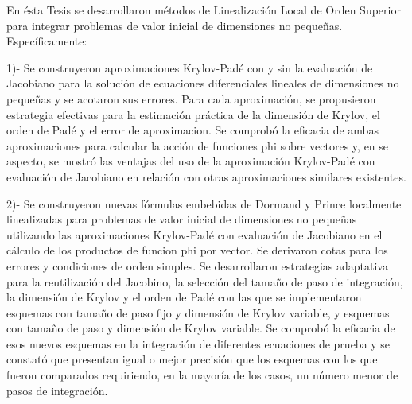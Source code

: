 \begin{conclusions}

    
    En ésta Tesis se desarrollaron métodos de Linealización Local de Orden Superior para integrar problemas de valor
    inicial de dimensiones no pequeñas. Específicamente: 

    1)- Se construyeron aproximaciones Krylov-Padé con y sin la evaluación de Jacobiano para la solución de ecuaciones diferenciales lineales de dimensiones no pequeñas y se acotaron sus errores. Para cada aproximación, se propusieron estrategia efectivas para la estimación práctica de la dimensión de Krylov, el orden de Padé y el error de aproximacion. Se comprobó la eficacia de ambas aproximaciones para calcular la acción de funciones phi sobre vectores y, en se aspecto, se mostró las ventajas del uso de la aproximación Krylov-Padé con evaluación de Jacobiano en relación con otras aproximaciones similares existentes. 
    
    
    2)- Se construyeron nuevas fórmulas embebidas de Dormand y Prince localmente linealizadas para problemas de valor inicial de dimensiones no pequeñas utilizando las aproximaciones Krylov-Padé con evaluación de Jacobiano en el cálculo de los productos de funcion phi por vector. Se derivaron cotas para los errores y condiciones de orden simples. Se  desarrollaron estrategias adaptativa para la reutilización del Jacobino, la selección del tamaño de paso de integración, la dimensión de Krylov y el orden de Padé con las que se implementaron esquemas con tamaño de paso fijo y dimensión de Krylov variable, y esquemas con tamaño de paso y dimensión de Krylov variable. Se comprobó la eficacia de esos nuevos esquemas en la integración de diferentes ecuaciones de prueba y se constató que presentan igual o mejor precisión que los esquemas con los que fueron comparados requiriendo, en la mayoría de los casos, un número menor de pasos de integración.
    

\end{conclusions}

